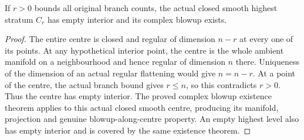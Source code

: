 \begin{lemma}
\label{hir:general-nc-highest-stratum-actual-blowup}
\leanok
If $r>0$ bounds all original branch counts, the actual closed smooth
highest stratum $C_r$ has empty interior and its complex blowup exists.
\end{lemma}
\begin{proof}
The entire centre is closed and regular of dimension $n-r$ at every
one of its points. At any hypothetical interior point, the centre is
the whole ambient manifold on a neighbourhood and hence regular of
dimension $n$ there. Uniqueness of the dimension of an actual regular
flattening would give $n=n-r$. At a point of the centre, the actual
branch bound gives $r\le n$, so this contradicts $r>0$. Thus the centre
has empty interior. The proved complex blowup existence theorem applies
to this actual closed smooth centre, producing its manifold, projection
and genuine blowup-along-centre property. An empty highest level also
has empty interior and is covered by the same existence theorem.
\end{proof}

